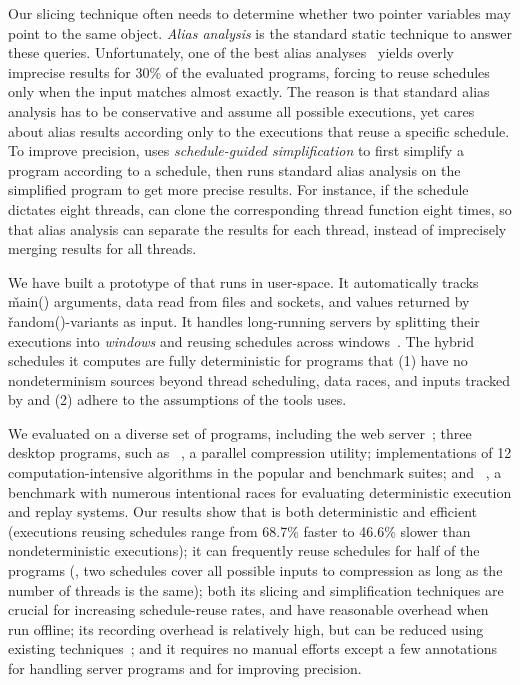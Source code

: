 Our slicing technique often needs to determine whether two pointer
variables may point to the same object.  \emph{Alias
  analysis} is the standard static technique to answer these queries.
Unfortunately, one of the best alias analyses~\cite{bddalias:pldi04} yields
overly
imprecise results for 30\% of the evaluated programs, forcing \peregrine to
reuse
schedules only when the input matches almost exactly.  The reason is that
standard
alias analysis has to be conservative and assume all possible executions,
yet \peregrine cares about alias results
according only to the executions that reuse a specific schedule.  To
improve precision, \peregrine uses \emph{schedule-guided simplification} to
first simplify a program according to a schedule, then runs standard alias
analysis on the simplified program to get more precise results.  For
instance, if the schedule dictates eight threads, \peregrine can clone
the corresponding thread function eight times, so that alias analysis can
separate the results for each thread, instead of imprecisely merging
results for all threads.

We have built a prototype of \peregrine that runs in user-space.
It automatically tracks \v{main()}
arguments, data read from files and sockets, and values
returned by \v{random()}-variants as input.  It handles long-running servers by
splitting their executions into \emph{windows} and
reusing schedules across windows~\cite{cui:tern:osdi10}.
The hybrid schedules it computes are fully deterministic for programs that
(1) have no nondeterminism sources beyond thread scheduling, data races, and
inputs tracked by \peregrine and (2) adhere to the assumptions of the tools
\peregrine uses.

We evaluated \peregrine on a diverse set of \nprog programs, including the
\apache web server~\cite{apache}; three desktop programs, such as
\pbzip~\cite{pbzip2}, a parallel compression utility; implementations of
12 computation-intensive algorithms in the popular \splash and \parsec
benchmark suites; and \racey~\cite{racy-stress}, a benchmark with numerous
intentional races for evaluating deterministic execution and replay
systems.  Our results show that \peregrine is both deterministic and efficient
(executions reusing schedules range from 68.7\% faster to 46.6\% slower
than nondeterministic executions); it can frequently reuse schedules for
half of the programs (\eg, two schedules cover all possible inputs to
\pbzip compression as long as the number of threads is the same); both its
slicing and
simplification techniques are crucial for increasing schedule-reuse rates,
and have reasonable overhead when run offline; its recording overhead
is relatively high, but can be reduced using existing
techniques~\cite{idna:vee06}; and it requires no manual efforts except a
few annotations for handling server programs and for improving precision.

